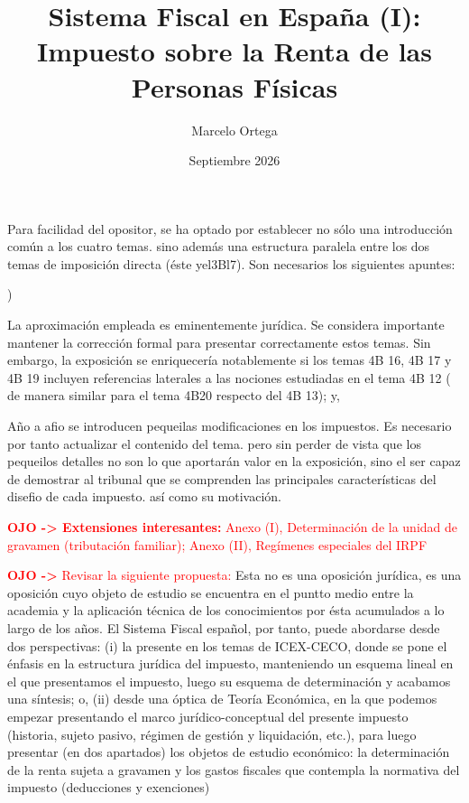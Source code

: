 \documentclass[10pt,a4paper]{article}
\title{Sistema Fiscal en España (I): Impuesto sobre la Renta de las Personas Físicas\\
\large }
\author{Marcelo Ortega}
\date{Septiembre 2026}
\newcounter{alphaitem}
\newcommand{\puntosclave}[1]{%
  \begin{tcolorbox}[
    colframe=black,
    title={Puntos clave},
    before upper={\setlength{\parindent}{0.5cm}\setlength{\parskip}{0.5\baselineskip}}
  ]
  #1
  \end{tcolorbox}
}
\newenvironment{la}
      {\begin{list}{\alph{alphaitem})}{%
          \usecounter{alphaitem}%
          \setlength{\leftmargin}{1cm}%
          \setlength{\parskip}{3pt}%
          \setlength{\itemsep}{0pt}%
          \setlength{\parsep}{0pt}%
      }}
      {\end{list}}
\begin{document}
\maketitle
\newpage

\puntosclave{ %
     Para facilidad del opositor, se ha optado por establecer no sólo una introducción común a los cuatro temas. sino además una estructura paralela entre los dos temas de imposición directa (éste yel3Bl7). Son necesarios los siguientes apuntes:
     \begin{la}
         \item La aproximación empleada es eminentemente jurídica. Se considera importante mantener la corrección formal para presentar correctamente estos temas. Sin embargo, la exposición se enriquecería notablemente si los temas 4B 16, 4B 17 y 4B 19 incluyen referencias laterales a las nociones estudiadas en el tema 4B 12 ( de manera similar para el tema 4B20 respecto del 4B 13); y,
         \item Año a afio se introducen pequeilas modificaciones en los impuestos. Es necesario por tanto actualizar el contenido del tema. pero sin perder de vista que los pequeilos detalles no son lo que aportarán valor en la exposición, sino el ser capaz de demostrar al tribunal que se comprenden las principales características del disefio de cada impuesto. así como su motivación.
     \end{la}

     \textcolor{red}{\textbf{OJO -> Extensiones interesantes:} Anexo (I), Determinación de la unidad de gravamen (tributación familiar); Anexo (II), Regímenes especiales del IRPF}

     \textcolor{red}{\textbf{OJO ->} Revisar la siguiente propuesta:} Esta no es una oposición jurídica, es una oposición cuyo objeto de estudio se encuentra en el puntto medio entre la academia y la aplicación técnica de los conocimientos por ésta acumulados a lo largo de los años. El Sistema Fiscal español, por tanto, puede abordarse desde dos perspectivas: (i) la presente en los temas de ICEX-CECO, donde se pone el énfasis en la estructura jurídica del impuesto, manteniendo un esquema lineal en el que presentamos el impuesto, luego su esquema de determinación y acabamos una síntesis; o, (ii) desde una óptica de Teoría Económica, en la que podemos empezar presentando el marco jurídico-conceptual del presente impuesto (historia, sujeto pasivo, régimen de gestión y liquidación, etc.), para luego presentar (en dos apartados) los objetos de estudio económico: la determinación de la renta sujeta a gravamen y los gastos fiscales que contempla la normativa del impuesto (deducciones y exenciones)
    }
\vspace{1cm}
\end{document}
